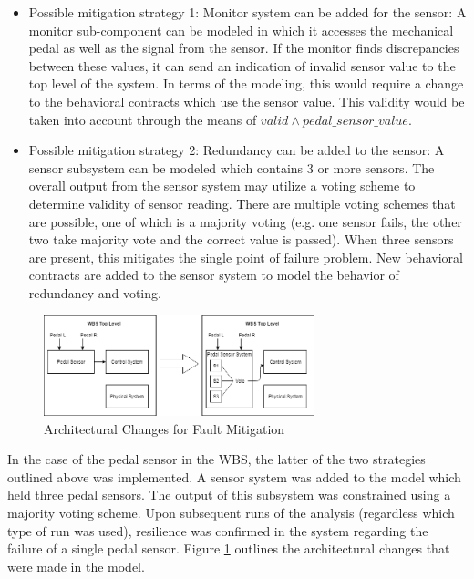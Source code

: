 \begin{itemize}
\item Possible mitigation strategy 1: Monitor system can be added for the sensor: A monitor sub-component can be modeled in which it accesses the mechanical pedal as well as the signal from the sensor. If the monitor finds discrepancies between these values, it can send an indication of invalid sensor value to the top level of the system. In terms of the modeling, this would require a change to the behavioral contracts which use the sensor value. This validity would be taken into account through the means of $valid \land pedal\_sensor\_value$. 

\item Possible mitigation strategy 2: Redundancy can be added to the sensor: A sensor subsystem can be modeled which contains 3 or more sensors. The overall output from the sensor system may utilize a voting scheme to determine validity of sensor reading. There are multiple voting schemes that are possible, one of which is a majority voting (e.g. one sensor fails, the other two take majority vote and the correct value is passed). 
When three sensors are present, this mitigates the single point of failure problem. New behavioral contracts are added to the sensor system to model the behavior of redundancy and voting. 
\end{itemize}
\begin{figure}[htbp]
	\begin{center}
		\includegraphics[width=0.7\textwidth]{images/sensorsystem.png}
	\end{center}
	\vspace{-0.3in}
	\caption{Architectural Changes for Fault Mitigation}
	\label{fig:sensorsystem}
\end{figure}
In the case of the pedal sensor in the WBS, the latter of the two strategies outlined above was implemented. A sensor system was added to the model which held three pedal sensors. The output of this subsystem was constrained using a majority voting scheme. Upon subsequent runs of the analysis (regardless which type of run was used), resilience was confirmed in the system regarding the failure of a single pedal sensor. Figure \ref{fig:sensorsystem} outlines the architectural changes that were made in the model.

